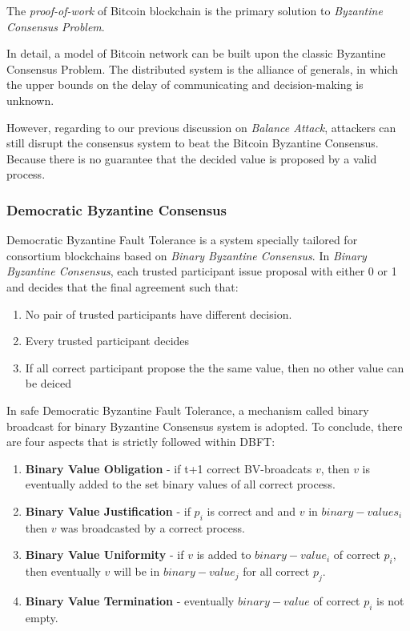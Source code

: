 \documentclass[12pt]{article}
\begin{document}
The \textit{proof-of-work} of Bitcoin blockchain is the primary solution to \textit{Byzantine Consensus Problem}. 

In detail, a model of Bitcoin network can be built upon the classic Byzantine Consensus Problem. The distributed system is the alliance of generals, in which the upper bounds on the delay of communicating and decision-making is unknown. 

However, regarding to our previous discussion on \textit{Balance Attack}, attackers can still disrupt the consensus system to beat the Bitcoin Byzantine Consensus. Because there is no guarantee that the decided value is proposed by a valid process.

\subsubsection{Democratic Byzantine Consensus}

Democratic Byzantine Fault Tolerance is a system specially tailored for consortium blockchains based on \textit{Binary Byzantine Consensus}. In \textit{Binary Byzantine Consensus}, each trusted participant issue proposal with either 0 or 1 and decides that the final agreement such that:

\begin{enumerate}
    \item No pair of trusted participants have different decision.
    \item Every trusted participant decides
    \item If all correct participant propose the the same value, then no other value can be deiced
\end{enumerate}

In safe Democratic Byzantine Fault Tolerance, a mechanism called binary broadcast for binary Byzantine Consensus system is adopted. To conclude, there are four aspects that is strictly followed within DBFT:

\begin{enumerate}
    \item \textbf{Binary Value Obligation} - if t+1 correct BV-broadcats $v$, then $v$ is eventually added to the set binary values of all correct process.
    \item \textbf{Binary Value Justification} - if $p_i$ is correct and and $v$ in $binary-values_i$ then $v$ was broadcasted by a correct process.
    \item \textbf{Binary Value Uniformity} - if $v$ is added to $binary-value_i$ of correct $p_i$, then eventually $v$ will be in $binary-value_j$ for all correct $p_j$.
    \item \textbf{Binary Value Termination} - eventually $binary-value$ of correct $p_i$ is not empty. 
\end{enumerate}
\end{document}
